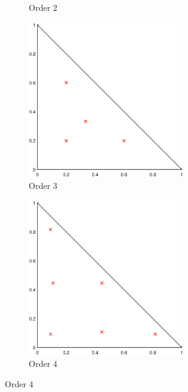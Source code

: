 \begin{figure}
{\begin{subfigure}[b]{0.475\textwidth}
		\caption{Order 2}
	\end{subfigure}
}
\vspace{3mm}
{
	\begin{subfigure}[b]{0.475\textwidth}
		\centering
		\label{subfig::2DInt_RefTri_Q3}
		\includegraphics[width=0.75\textwidth]{figures/sec_BF/RefTriQuad_Q3.eps}
		\caption{Order 3}
	\end{subfigure}
	\hfill
	\begin{subfigure}[b]{0.475\textwidth}
		\centering
		\label{subfig::2DInt_RefTri_Q4}
		\includegraphics[width=0.75\textwidth]{figures/sec_BF/RefTriQuad_Q4.eps}
		\caption{Order 4}
	\end{subfigure}
}
\vspace{3mm}

\end{figure}
